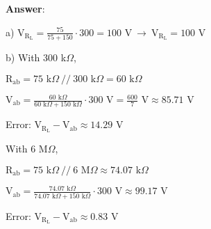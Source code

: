 \documentclass{article}
\begin{document}
\vspace{4mm}

{\textbf{Answer}:}

\vspace{4mm}

{a) $\displaystyle \text{V}_{\text{R}_\text{L}} = \frac{75}{75 + 150}\cdot 300 = 100\text{ V} \ \rightarrow \ \boxed{\text{V}_{\text{R}_\text{L}} = 100\text{ V}}$}

\vspace{8mm}

{b) With 300 k$\Omega$,}

\vspace{4mm}

{$\displaystyle \text{R}_{\text{ab}} = 75 \text{ k}\Omega\ //\ 300\text{ k}\Omega = 60\text{ k}\Omega\ $}

\vspace{4mm}

{$\displaystyle \text{V}_{\text{ab}} = \frac{60 \text{ k}\Omega}{60 \text{ k}\Omega + 150 \text{ k}\Omega} \cdot 300 \text{ V} = \frac{600}{7} \text{ V} \approx 85.71 \text{ V} $}

\vspace{4mm}

{Error: $\displaystyle \text{V}_{\text{R}_\text{L}} - \text{V}_{\text{ab}} \approx 14.29 \text{ V} $}

\vspace{16mm}

{With 6 M$\Omega$,}

\vspace{4mm}

{$\displaystyle \text{R}_{\text{ab}} = 75 \text{ k}\Omega\ //\ 6\text{ M}\Omega \approx 74.07\text{ k}\Omega\ $}

\vspace{4mm}

{$\displaystyle \text{V}_{\text{ab}} = \frac{74.07 \text{ k}\Omega}{74.07 \text{ k}\Omega + 150 \text{ k}\Omega} \cdot 300 \text{ V} \approx 99.17 \text{ V} $}

\vspace{4mm}

{Error: $\displaystyle \text{V}_{\text{R}_\text{L}} - \text{V}_{\text{ab}} \approx 0.83 \text{ V} $}

\vspace{8mm}


\end{document}

